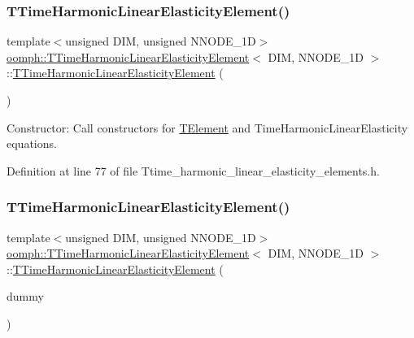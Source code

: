 \subsubsection{\texorpdfstring{T\+Time\+Harmonic\+Linear\+Elasticity\+Element()}{TTimeHarmonicLinearElasticityElement()}\hspace{0.1cm}{\footnotesize\ttfamily [1/2]}}
{\footnotesize\ttfamily template$<$unsigned D\+IM, unsigned N\+N\+O\+D\+E\+\_\+1D$>$ \\
\hyperlink{classoomph_1_1TTimeHarmonicLinearElasticityElement}{oomph\+::\+T\+Time\+Harmonic\+Linear\+Elasticity\+Element}$<$ D\+IM, N\+N\+O\+D\+E\+\_\+1D $>$\+::\hyperlink{classoomph_1_1TTimeHarmonicLinearElasticityElement}{T\+Time\+Harmonic\+Linear\+Elasticity\+Element} (\begin{DoxyParamCaption}{ }\end{DoxyParamCaption})\hspace{0.3cm}{\ttfamily [inline]}}



Constructor\+: Call constructors for \hyperlink{classoomph_1_1TElement}{T\+Element} and Time\+Harmonic\+Linear\+Elasticity equations. 



Definition at line 77 of file Ttime\+\_\+harmonic\+\_\+linear\+\_\+elasticity\+\_\+elements.\+h.

\mbox{\label{classoomph_1_1TTimeHarmonicLinearElasticityElement_a4078f42e6e4495e1985fcf3f142bedc1}} 
\subsubsection{\texorpdfstring{T\+Time\+Harmonic\+Linear\+Elasticity\+Element()}{TTimeHarmonicLinearElasticityElement()}\hspace{0.1cm}{\footnotesize\ttfamily [2/2]}}
{\footnotesize\ttfamily template$<$unsigned D\+IM, unsigned N\+N\+O\+D\+E\+\_\+1D$>$ \\
\hyperlink{classoomph_1_1TTimeHarmonicLinearElasticityElement}{oomph\+::\+T\+Time\+Harmonic\+Linear\+Elasticity\+Element}$<$ D\+IM, N\+N\+O\+D\+E\+\_\+1D $>$\+::\hyperlink{classoomph_1_1TTimeHarmonicLinearElasticityElement}{T\+Time\+Harmonic\+Linear\+Elasticity\+Element} (\begin{DoxyParamCaption}\item[{const \hyperlink{classoomph_1_1TTimeHarmonicLinearElasticityElement}{T\+Time\+Harmonic\+Linear\+Elasticity\+Element}$<$ D\+IM, N\+N\+O\+D\+E\+\_\+1D $>$ \&}]{dummy }\end{DoxyParamCaption})\hspace{0.3cm}{\ttfamily [inline]}}



